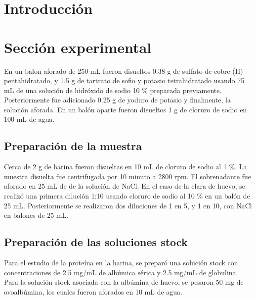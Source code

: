 \documentclass[fleqn,10pt]{SelfArx}
\begin{document}
\flushbottom %

\maketitle %

\thispagestyle{empty} %




\section*{Introducci\'on} %
	
\section{Secci\'on experimental}
En un balon aforado de 250 mL fueron disueltos 0.38 g de sulfato de cobre (II) pentahidratado, y 1.5 g de tartrato de sofio y potasio tetrahidratado usando 75 mL de una soluci\'on de hidr\'oxido de sodio 10 \% preparada previamente. Posteriormente fue adicionado 0.25 g de yoduro de potasio y finalmente, la soluci\'on aforada. En un balón aparte fueron disueltos 1 g de cloruro de sodio en 100 mL de agua.
	\subsection{Preparaci\'on de la muestra}
		Cerca de 2 g de harina fueron disueltas en 10 mL de cloruro de sodio al 1 \%. La muestra disuelta fue centrifugada por 10 minuto a 2800 rpm. El sobrenadante fue aforado en 25 mL de de la soluci\'on de NaCl. En el caso de la clara de huevo, se realiz\'o una primera diluci\'on 1:10 usando cloruro de sodio al 10 \% en un bal\'on de 25 mL. Posteriormente se realizaron dos diluciones de 1 en 5, y 1 en 10, con NaCl en balones de 25 mL.
		
	\subsection{Preparaci\'on de las soluciones stock}
		Para el estudio de la prote\'ina en la harina, se prepar\'o una soluci\'on stock con concentraciones de 2.5 mg/mL de alb\'umica s\'erica y 2.5 mg/mL de globulina. Para la soluci\'on stock asociada con la alb\'umina de huevo, se pesaron 50 mg de ovoalb\'umina, los cuales fueron aforados en 10 mL de agua.
\end{document}
